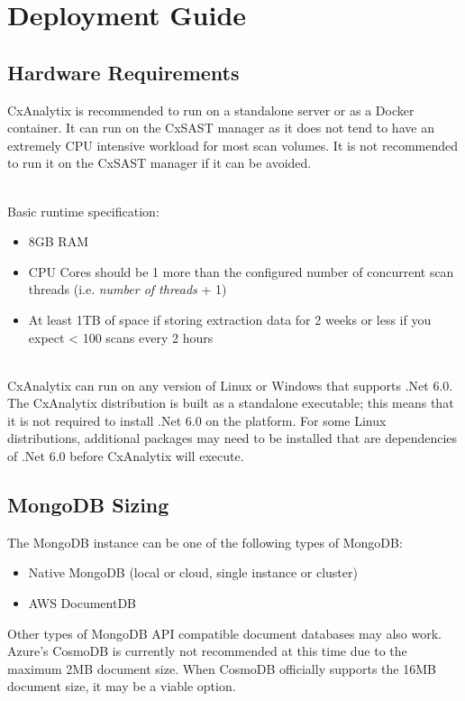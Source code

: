 \chapter{Deployment Guide}


\section{Hardware Requirements}

CxAnalytix is recommended to run on a standalone server or as a Docker container. It can run on the CxSAST manager 
as it does not tend to have an extremely CPU intensive workload for most scan volumes. It is not recommended to run it on the CxSAST manager 
if it can be avoided.

\noindent\\
Basic runtime specification:
    \begin{itemize}
        \item 8GB RAM
        \item CPU Cores should be 1 more than the configured number of concurrent scan threads (i.e. \textit{number of threads} + 1)
        \item At least 1TB of space if storing extraction data for 2 weeks or less if you expect < 100 scans every 2 hours
    \end{itemize}

\noindent\\CxAnalytix can run on any version of Linux or Windows that supports .Net 6.0.  The CxAnalytix distribution is built
as a standalone executable; this means that it is not required to install .Net 6.0 on the platform.  For some Linux distributions,
additional packages may need to be installed that are dependencies of .Net 6.0 before CxAnalytix will execute.

\section{MongoDB Sizing}

The MongoDB instance can be one of the following types of MongoDB:

\begin{itemize}
    \item Native MongoDB (local or cloud, single instance or cluster)
    \item AWS DocumentDB
\end{itemize}

\noindent Other types of MongoDB API compatible document databases may also work.  Azure's CosmoDB is currently not recommended at this time due to the 
maximum 2MB document size.  When CosmoDB officially supports the 16MB document size, it may be a viable option.

